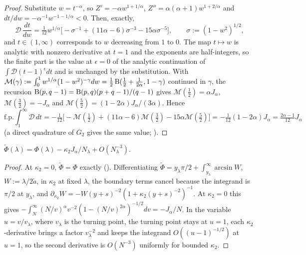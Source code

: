 \begin{proof}
 Substitute $w=t^{-\alpha}$, so $Z'=-\alpha w^{1+1/\alpha}$, $Z''=\alpha(\alpha+1)w^{1+2/\alpha}$
and $dt/dw=-\alpha^{-1}w^{-1-1/\alpha}<0$. Then, exactly,
\[
  \mathcal D\,\frac{dt}{dw}=\tfrac1{12}w^{1/\alpha}\bigl[-\sigma^{-1}+(11\alpha-6)\sigma^{-3}-15\alpha\sigma^{-5}\bigr],\qquad
  \sigma:=(1-w^2)^{1/2},
\]
and $t\in(1,\infty)$ corresponds to $w$ decreasing from $1$ to $0$.
The map $t\mapsto w$ is analytic with nonzero derivative at $t=1$ and the exponents are
half-integers, so the finite part is the value at $\epsilon=0$ of the analytic continuation of
$\int \mathcal D(t-1)^\epsilon dt$ and is unchanged by the substitution. With
$\mathcal M(\gamma):=\int_0^1w^{1/\alpha}(1-w^2)^{-\gamma}dw=\frac12\operatorname{B}(\frac12+\frac1{2\alpha},1-\gamma)$ continued
in $\gamma$, the recursion $\operatorname{B}(p,q-1)=\operatorname{B}(p,q)(p+q-1)/(q-1)$ gives $\mathcal M(\frac12)=\alpha J_\alpha$,
$\mathcal M(\frac32)=-J_\alpha$ and $\mathcal M(\frac52)=(1-2\alpha)J_\alpha/(3\alpha)$. Hence
\[
  \mathrm{f.p.}\!\int_1^\infty \mathcal D\,dt=-\tfrac1{12}\bigl[-\mathcal M(\tfrac12)+(11\alpha-6)\mathcal M(\tfrac32)-15\alpha\mathcal M(\tfrac52)\bigr]
  =-\tfrac1{12}(1-2\alpha)J_\alpha=\tfrac{2\alpha-1}{12}J_\alpha
\]
(a direct quadrature of $G_2$ gives the same value; ).
\end{proof}

\begin{lemma}\label{lem:kappa2}
$\tilde\Phi(\lambda)=\Phi(\lambda)-\kappa_2J_\alpha/N_\lambda+O(N_\lambda^{-3})$.
\end{lemma}

\begin{proof}
At $\kappa_2=0$, $\tilde\Phi=\Phi$ exactly (). Differentiating
$\tilde\Phi=y_\lambda\pi/2+\int_{y_\lambda}^\infty\arcsin W$, $W:=\lambda/2\tilde a$, in $\kappa_2$ at fixed $\lambda$,
the boundary terms cancel because the integrand is $\pi/2$ at $y_\lambda$, and
$\partial_{\kappa_2}W=-W(y+s)^{-2}(1+\kappa_2(y+s)^{-2})^{-1}$. At $\kappa_2=0$ this gives
$-\int_N^\infty(N/v)^\alpha v^{-2}(1-(N/v)^{2\alpha})^{-1/2}dv=-J_\alpha/N$. In the variable $u=v/v_\lambda$, where
$v_\lambda$ is the turning point, the turning point stays at $u=1$, each $\kappa_2$-derivative brings a
factor $v_\lambda^{-2}$ and keeps the integrand $O((u-1)^{-1/2})$ at $u=1$, so the second derivative is
$O(N^{-3})$ uniformly for bounded $\kappa_2$.
\end{proof}

